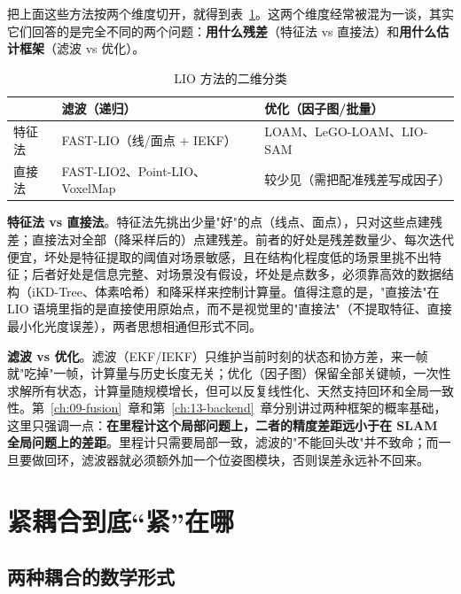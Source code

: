 把上面这些方法按两个维度切开，就得到表~\ref{tab:16-routes}。这两个维度经常被混为一谈，其实它们回答的是完全不同的两个问题：\textbf{用什么残差}（特征法 vs 直接法）和\textbf{用什么估计框架}（滤波 vs 优化）。

\begin{table}[htbp]
  \centering
  \caption{LIO 方法的二维分类}\label{tab:16-routes}
  \small
  \begin{tabular}{lll}
    \toprule
    & 滤波（递归） & 优化（因子图/批量） \\
    \midrule
    特征法 & FAST-LIO（线/面点 + IEKF） & LOAM、LeGO-LOAM、LIO-SAM \\
    直接法 & FAST-LIO2、Point-LIO、VoxelMap & 较少见（需把配准残差写成因子） \\
    \bottomrule
  \end{tabular}
\end{table}

\textbf{特征法 vs 直接法}。特征法先挑出少量"好"的点（线点、面点），只对这些点建残差；直接法对全部（降采样后的）点建残差。前者的好处是残差数量少、每次迭代便宜，坏处是特征提取的阈值对场景敏感，且在结构化程度低的场景里挑不出特征；后者好处是信息完整、对场景没有假设，坏处是点数多，必须靠高效的数据结构（iKD-Tree、体素哈希）和降采样来控制计算量。值得注意的是，"直接法"在 LIO 语境里指的是直接使用原始点，而不是视觉里的"直接法"（不提取特征、直接最小化光度误差），两者思想相通但形式不同。

\textbf{滤波 vs 优化}。滤波（EKF/IEKF）只维护当前时刻的状态和协方差，来一帧就"吃掉"一帧，计算量与历史长度无关；优化（因子图）保留全部关键帧，一次性求解所有状态，计算量随规模增长，但可以反复线性化、天然支持回环和全局一致性。第~\ref{ch:09-fusion}~章和第~\ref{ch:13-backend}~章分别讲过两种框架的概率基础，这里只强调一点：\textbf{在里程计这个局部问题上，二者的精度差距远小于在 SLAM 全局问题上的差距}。里程计只需要局部一致，滤波的"不能回头改"并不致命；而一旦要做回环，滤波器就必须额外加一个位姿图模块，否则误差永远补不回来。

\section{紧耦合到底“紧”在哪}\label{sec:16-tight}

\subsection{两种耦合的数学形式}

